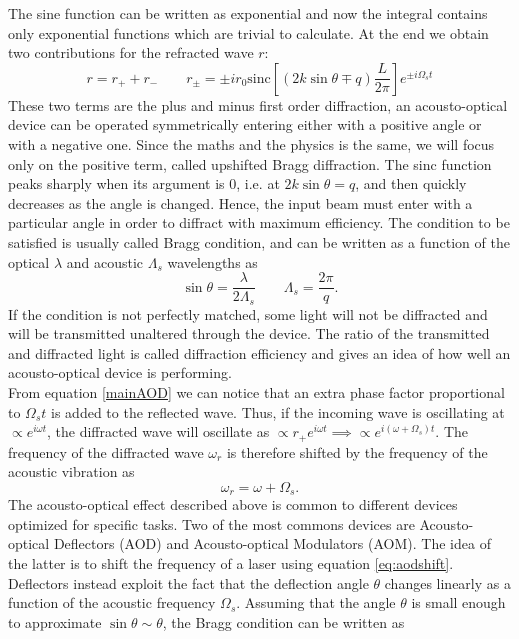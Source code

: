 The sine function can be written as exponential and now the integral contains only exponential functions which are trivial to calculate. At the end we obtain two contributions for the refracted wave $r$:
\begin{equation}
\label{mainAOD}
r = r_+ + r_- \qquad r_\pm = \pm i r_0 \text{sinc} \left[(2k\sin\theta \mp q)\frac{L}{2\pi} \right]e^{\pm i\Omega_s t}
\end{equation}
These two terms are the plus and minus first order diffraction, an acousto-optical device can be operated symmetrically entering either with a positive angle or with a negative one. Since the maths and the physics is the same, we will focus only on the positive term, called upshifted Bragg diffraction. The sinc function peaks sharply when its argument is 0, i.e. at $2k\sin\theta = q$, and then quickly decreases as the angle is changed. Hence, the input beam must enter with a particular angle in order to diffract with maximum efficiency. The condition to be satisfied is usually called Bragg condition, and can be written as a function of the optical $\lambda$ and acoustic $\Lambda_s$ wavelengths as
\begin{equation}
\label{braggcondition}
\sin \theta  = \frac{\lambda}{2 \Lambda_s} \qquad \Lambda_s = \frac{2\pi}{q}.
\end{equation}
If the condition is not perfectly matched, some light will not be diffracted and will be transmitted unaltered through the device.
The ratio of the transmitted and diffracted light is called diffraction efficiency and gives an idea of how well an acousto-optical device is performing.\\
From equation \eqref{mainAOD} we can notice that an extra phase factor proportional to $\Omega_s t$ is added to the reflected wave. Thus, if the incoming wave is oscillating at $\propto e^{i\omega t}$, the diffracted wave will oscillate as $\propto r_{+}e^{i\omega t} \implies \propto e^{i(\omega + \Omega_s )t}$. The frequency of the diffracted wave $\omega_r$ is therefore shifted by the frequency of the acoustic vibration as
\begin{equation}
\label{eq:aodshift}
\omega_r  =  \omega + \Omega_s.
\end{equation}
The acousto-optical effect described above is common to different devices optimized for specific tasks. Two of the most commons devices are Acousto-optical Deflectors (AOD) and Acousto-optical Modulators (AOM). The idea of the latter is to shift the frequency of a laser using equation \eqref{eq:aodshift}. Deflectors instead exploit the fact that the deflection angle $\theta$ changes linearly as a function of the acoustic frequency $\Omega_s$. Assuming that the angle $\theta$ is small enough to approximate $\sin\theta \sim \theta$, the Bragg condition can be written as
